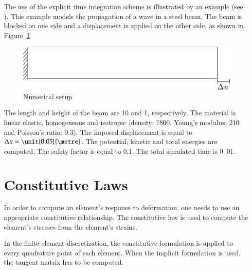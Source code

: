The use of the explicit time integration scheme is illustrated by an
example (see ).  This
example models the propagation of a wave in a steel beam. The beam is
blocked on one side and a displacement is applied on the other side,
as shown in Figure~\ref{fig:smm:explicit}.

\begin{figure}[!htb] \centering
  \includegraphics[scale=.6]{figures/explicit_dynamic}
  \caption{Numerical setup \label{fig:smm:explicit}}
\end{figure}

The length and height of the beam are \unit{10}{\metre} and
\unit{1}{\metre}, respectively.  The material is linear elastic,
homogeneous and isotropic (density:
\unit{7800}{\kilogrampercubicmetre}, Young's modulus:
\unit{210}{\giga\pascal} and Poisson's ratio: $0.3$).  The imposed
displacement is equal to $\Delta u = \unit{0.05}{\metre}$. The
potential, kinetic and total energies are computed.  The safety factor
is equal to $0.1$.  The total simulated time is \unit{0.01}{\second}.

\section{Constitutive Laws \label{sect:smm:CL}}
In order to compute an element's response to deformation, one needs to
use an appropriate constitutive relationship. The constitutive law is
used to compute the element's stresses from the element's strains.

In the finite-element discretization, the constitutive formulation is
applied to every quadrature point of each element. When the implicit
formulation is used, the tangent matrix has to be computed.

